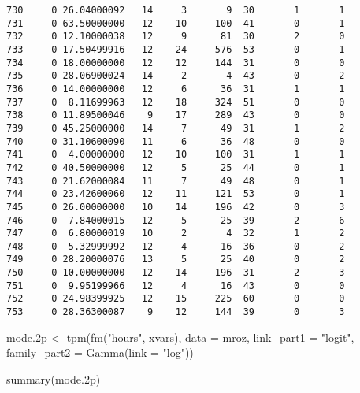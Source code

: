 \documentclass[
  letterpaper,
  DIV=11,
  numbers=noendperiod]{scrreprt}
\newenvironment{Shaded}{\begin{snugshade}}{\end{snugshade}}
\newcommand{\AttributeTok}[1]{\textcolor[rgb]{0.40,0.45,0.13}{#1}}
\newcommand{\FloatTok}[1]{\textcolor[rgb]{0.68,0.00,0.00}{#1}}
\newcommand{\FunctionTok}[1]{\textcolor[rgb]{0.28,0.35,0.67}{#1}}
\newcommand{\NormalTok}[1]{\textcolor[rgb]{0.00,0.23,0.31}{#1}}
\newcommand{\OtherTok}[1]{\textcolor[rgb]{0.00,0.23,0.31}{#1}}
\newcommand{\StringTok}[1]{\textcolor[rgb]{0.13,0.47,0.30}{#1}}
\begin{document}
\begin{verbatim}
730     0 26.04000092   14     3       9  30       1       1
731     0 63.50000000   12    10     100  41       0       1
732     0 12.10000038   12     9      81  30       2       0
733     0 17.50499916   12    24     576  53       0       1
734     0 18.00000000   12    12     144  31       0       0
735     0 28.06900024   14     2       4  43       0       2
736     0 14.00000000   12     6      36  31       1       1
737     0  8.11699963   12    18     324  51       0       0
738     0 11.89500046    9    17     289  43       0       0
739     0 45.25000000   14     7      49  31       1       2
740     0 31.10600090   11     6      36  48       0       0
741     0  4.00000000   12    10     100  31       1       1
742     0 40.50000000   12     5      25  44       0       1
743     0 21.62000084   11     7      49  48       0       1
744     0 23.42600060   12    11     121  53       0       1
745     0 26.00000000   10    14     196  42       0       3
746     0  7.84000015   12     5      25  39       2       6
747     0  6.80000019   10     2       4  32       1       2
748     0  5.32999992   12     4      16  36       0       2
749     0 28.20000076   13     5      25  40       0       2
750     0 10.00000000   12    14     196  31       2       3
751     0  9.95199966   12     4      16  43       0       0
752     0 24.98399925   12    15     225  60       0       0
753     0 28.36300087    9    12     144  39       0       3
\end{verbatim}

\begin{Shaded}
\begin{Highlighting}[]
\NormalTok{mode}\FloatTok{.2}\NormalTok{p }\OtherTok{\textless{}{-}} \FunctionTok{tpm}\NormalTok{(}\FunctionTok{fm}\NormalTok{(}\StringTok{"hours"}\NormalTok{, xvars),}
               \AttributeTok{data =}\NormalTok{ mroz,}
               \AttributeTok{link\_part1 =} \StringTok{"logit"}\NormalTok{, }
               \AttributeTok{family\_part2 =} \FunctionTok{Gamma}\NormalTok{(}\AttributeTok{link =} \StringTok{"log"}\NormalTok{))}

\FunctionTok{summary}\NormalTok{(mode}\FloatTok{.2}\NormalTok{p)}
\end{Highlighting}
\end{Shaded}
\end{document}

